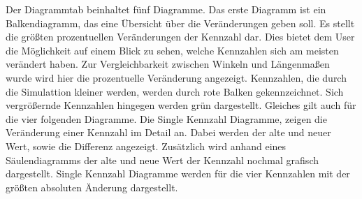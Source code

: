 		Der Diagrammtab beinhaltet fünf Diagramme. Das erste Diagramm ist ein Balkendiagramm, das eine Übersicht über die Veränderungen geben soll. Es stellt die größten prozentuellen Veränderungen der Kennzahl dar. Dies bietet dem User die Möglichkeit auf einem Blick zu sehen, welche Kennzahlen sich am meisten verändert haben. Zur Vergleichbarkeit zwischen Winkeln und Längenmaßen wurde wird hier die prozentuelle Veränderung angezeigt. Kennzahlen, die durch die Simulattion kleiner werden, werden durch rote Balken gekennzeichnet. Sich vergrößernde Kennzahlen hingegen werden grün dargestellt. Gleiches gilt auch für die vier folgenden Diagramme. Die Single Kennzahl Diagramme, zeigen die Veränderung einer Kennzahl im Detail an. Dabei werden der alte und neuer Wert, sowie die Differenz angezeigt. Zusätzlich wird anhand eines Säulendiagramms der alte und neue Wert der Kennzahl nochmal grafisch dargestellt. Single Kennzahl Diagramme werden für die vier Kennzahlen mit der größten absoluten Änderung dargestellt.
		
